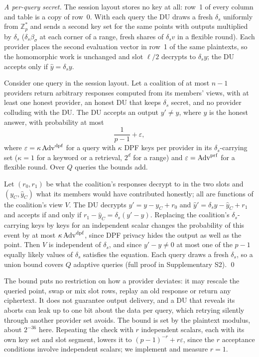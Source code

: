 \emph{A per-query secret.} The session layout stores no key at all: row~1 of
every column and table is a copy of row~0. With each query the DU draws a
fresh $\delta_s$ uniformly from $\mathbb{Z}_p^{*}$ and sends a second key set
for the same points with outputs multiplied by $\delta_s$
($\delta_s\beta_\sigma$ at each corner of a range, fresh shares of
$\delta_sv$ in a flexible round). Each provider places the second evaluation
vector in row~1 of the same plaintexts, so the homomorphic work is unchanged
and slot $\ell/2$ decrypts to $\delta_sy$; the DU accepts only if
$\hat y=\delta_sy$.

\begin{theorem}
\label{thm:tamper}
Consider one query in the session layout. Let a coalition of at most $n-1$
providers return arbitrary responses computed from its members' views, with at
least one honest provider, an honest DU that keeps $\delta_s$ secret, and no
provider colluding with the DU. The DU accepts an output $y'\neq y$, where $y$
is the honest answer, with probability at most
\[
\frac{1}{p-1}+\varepsilon ,
\]
where $\varepsilon=\kappa\,\mathrm{Adv}^{\mathrm{dpf}}$ for a query with $\kappa$ DPF keys per
provider in its $\delta_s$-carrying set ($\kappa=1$ for a keyword or a
retrieval, $2^d$ for a range) and $\varepsilon=\mathrm{Adv}^{\mathrm{prf}}$ for a flexible round.
Over $Q$ queries the bounds add.
\end{theorem}
\begin{pf}
Let $(r_0,r_1)$ be what the coalition's responses decrypt to in the two slots
and $(y_C,\hat y_C)$ what its members would have contributed honestly; all are
functions of the coalition's view $V$. The DU decrypts $y'=y-y_C+r_0$ and
$\hat y'=\delta_sy-\hat y_C+r_1$ and accepts if and only if
$r_1-\hat y_C=\delta_s(y'-y)$. Replacing the coalition's $\delta_s$-carrying
keys by keys for an independent scalar changes the probability of this event by
at most $\kappa\,\mathrm{Adv}^{\mathrm{dpf}}$, since DPF privacy hides the output as well as the
point. Then $V$ is independent of $\delta_s$, and since $y'-y\neq0$ at most one
of the $p-1$ equally likely values of $\delta_s$ satisfies the equation. Each
query draws a fresh $\delta_s$, so a union bound covers $Q$ adaptive queries
(full proof in Supplementary S2). \qed
\end{pf}
The bound puts no restriction on how a provider deviates: it may rescale the
queried point, swap or mix slot rows, replay an old response or return any
ciphertext. It does not guarantee output delivery, and a DU that reveals its
aborts can leak up to one bit about the data per query, which retrying silently
through another provider set avoids. The bound is set by the plaintext
modulus, about $2^{-36}$ here. Repeating the check with $r$ independent
scalars, each with its own key set and slot segment, lowers it to
$(p-1)^{-r}+r\varepsilon$, since the $r$ acceptance conditions involve
independent scalars; we implement and measure $r=1$.

